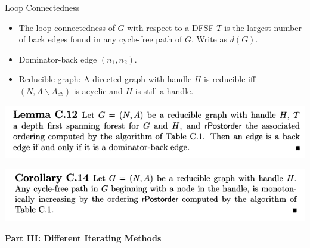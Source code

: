 \documentclass[aspectratio=1610, 13pt]{beamer}
\begin{document}
\begin{frame}{Loop Connectedness}
\begin{itemize}
\item The loop connectedness of $G$ with respect to a DFSF $T$ is the largest number of back edges found in any cycle-free path of $G$. Write as $d(G)$.
\item 

Dominator-back edge $(n_1, n_2)$.

\item 
Reducible graph: A directed graph with handle $H$ is reducible iff $(N, A\backslash A_{db})$ is acyclic and $H$ is still a handle.
\end{itemize}

\begin{center}
\includegraphics[scale=0.4]{lemmac12.png}

\includegraphics[scale=0.4]{lemmac14.png}
\end{center}
\end{frame}

\begin{frame}
\begin{center}
\Large
\textbf{Part III: Different Iterating Methods}
\end{center}

\end{frame}
\end{document}
